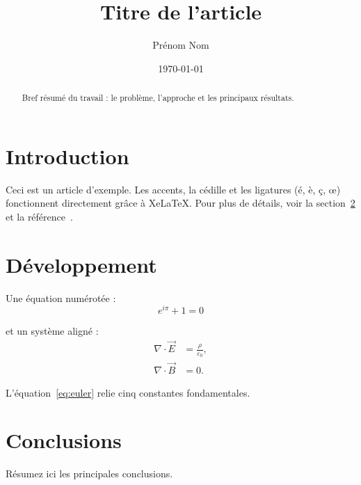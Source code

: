 \documentclass[11pt,a4paper]{article}
\title{Titre de l’article}
\author{Prénom Nom}
\date{\today}
\begin{document}
\maketitle

\begin{abstract}
  Bref résumé du travail : le problème, l’approche et les principaux résultats.
\end{abstract}

\section{Introduction}
\label{sec:introduction}

Ceci est un article d’exemple. Les accents, la cédille et les ligatures (é, è, ç, œ)
fonctionnent directement grâce à XeLaTeX. Pour plus de détails, voir la
section~\ref{sec:developpement} et la référence~\cite{knuth1984}.

\section{Développement}
\label{sec:developpement}

Une équation numérotée :
\begin{equation}
  \label{eq:euler}
  e^{i\pi} + 1 = 0
\end{equation}

et un système aligné :
\begin{align}
  \nabla \cdot \vec{E} &= \frac{\rho}{\varepsilon_0}, \\
  \nabla \cdot \vec{B} &= 0.
\end{align}

L’équation~\eqref{eq:euler} relie cinq constantes fondamentales.

\section{Conclusions}

Résumez ici les principales conclusions.



\end{document}
